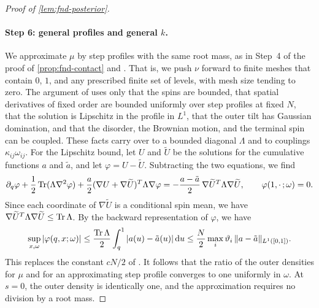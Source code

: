 \begin{proof}[Proof of \cref{lem:fnd-posterior}]
\paragraph{Step 6: general profiles and general $k$.}
We approximate $\mu$ by step profiles with the same root mass, as in
Step~4 of the proof of \cref{prop:fnd-contact} and
\cite[Section~2.6]{AL}. That is, we push $\nu$ forward to finite meshes that
contain $0$, $1$, and any prescribed finite set of levels, with mesh size
tending to zero. The argument of \cite[Section~2.6]{AL} uses only that
the spins are bounded, that spatial derivatives of fixed order are
bounded uniformly over step profiles at fixed $N$, that the solution is
Lipschitz in the profile in $L^1$, that the outer tilt has Gaussian
domination, and that the disorder, the Brownian motion, and the terminal
spin can be coupled. These facts carry over to a bounded diagonal
$\Lambda$ and to couplings $\kappa_{ij}\omega_{ij}$. For the Lipschitz
bound, let $U$ and $\widetilde U$ be the solutions for the cumulative
functions $a$ and $\tilde a$, and let $\varphi=U-\widetilde U$. Subtracting
the two equations, we find
\[
 \partial_q\varphi+\frac12\operatorname{Tr}(\Lambda\nabla^2\varphi)
 +\frac a2(\nabla U+\nabla\widetilde U)^T\Lambda\nabla\varphi
 =-\frac{a-\tilde a}{2}\,\nabla\widetilde U^T\Lambda\nabla\widetilde U,
 \qquad \varphi(1,\cdot\,;\omega)=0 .
\]
Since each coordinate of $\nabla\widetilde U$ is a conditional spin
mean, we have $\nabla\widetilde U^T\Lambda\nabla\widetilde U\le\operatorname{Tr}\Lambda$. By
the backward representation of $\varphi$, we have
\[
 \sup_{x,\omega}|\varphi(q,x;\omega)|\le\frac{\operatorname{Tr}\Lambda}2\int_q^1|a(u)-\tilde a(u)|\,\mathrm d u
 \le\frac N2\max_i\vartheta_i\,\|a-\tilde a\|_{L^1([0,1])}.
\]
This replaces the constant $cN/2$ of \cite[(2.19)]{AL}. It follows that
the ratio of the outer densities for $\mu$ and for an approximating step
profile converges to one uniformly in $\omega$. At $s=0$, the outer
density is identically one, and the approximation requires no division
by a root mass.


\end{proof}
